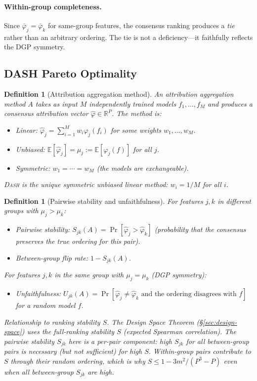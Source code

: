 \documentclass{article}
\newtheorem{definition}[theorem]{Definition}
\newcommand{\R}{\mathbb{R}}
\newcommand{\E}{\mathbb{E}}
\newcommand{\DASH}{\textsc{Dash}}
\begin{document}
\paragraph{Within-group completeness.}
Since $\bar{\varphi}_j = \bar{\varphi}_k$ for same-group features, the consensus ranking produces a \emph{tie} rather than an arbitrary ordering. The tie is not a deficiency---it faithfully reflects the DGP symmetry.

\subsection{DASH Pareto Optimality}
\label{sec:dash-pareto}

\begin{definition}[Attribution aggregation method]
An \emph{attribution aggregation method} $A$ takes as input $M$ independently trained models $f_1, \ldots, f_M$ and produces a consensus attribution vector $\hat\varphi \in \R^P$. The method is:
\begin{itemize}
    \item \emph{Linear}: $\hat\varphi_j = \sum_{i=1}^M w_i \varphi_j(f_i)$ for some weights $w_1, \ldots, w_M$.
    \item \emph{Unbiased}: $\E[\hat\varphi_j] = \mu_j := \E[\varphi_j(f)]$ for all $j$.
    \item \emph{Symmetric}: $w_1 = \cdots = w_M$ (the models are exchangeable).
\end{itemize}
\DASH{} is the unique symmetric unbiased linear method: $w_i = 1/M$ for all $i$.
\end{definition}

\begin{definition}[Pairwise stability and unfaithfulness]
For features $j, k$ in different groups with $\mu_j > \mu_k$:
\begin{itemize}
    \item \emph{Pairwise stability}: $S_{jk}(A) = \Pr[\hat\varphi_j > \hat\varphi_k]$ (probability that the consensus preserves the true ordering for this pair).
    \item \emph{Between-group flip rate}: $1 - S_{jk}(A)$.
\end{itemize}
For features $j, k$ in the same group with $\mu_j = \mu_k$ (DGP symmetry):
\begin{itemize}
    \item \emph{Unfaithfulness}: $U_{jk}(A) = \Pr[\hat\varphi_j \neq \hat\varphi_k \text{ and the ordering disagrees with } f]$ for a random model $f$.
\end{itemize}

\emph{Relationship to ranking stability $S$.} The Design Space Theorem (\S\ref{sec:design-space}) uses the full-ranking stability $S$ (expected Spearman correlation). The pairwise stability $S_{jk}$ here is a per-pair component: high $S_{jk}$ for all between-group pairs is necessary (but not sufficient) for high $S$. Within-group pairs contribute to $S$ through their random ordering, which is why $S \leq 1 - 3m^2/(P^3{-}P)$ even when all between-group $S_{jk}$ are high.
\end{definition}
\end{document}

